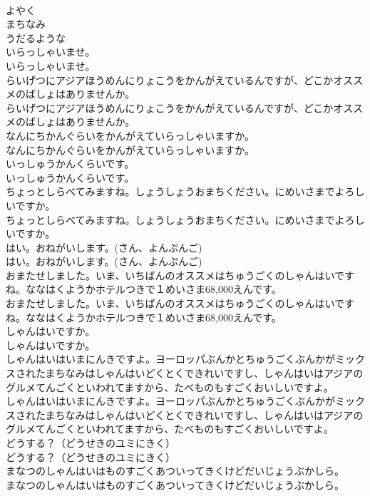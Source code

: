 \documentclass[8pt]{extreport}
\begin{document}
\begin{CJK}{UTF8}{min}
\\	よやく
\\	まちなみ
\\	うだるような
\\	いらっしゃいませ。	
\\	いらっしゃいませ。 
\\	らいげつにアジアほうめんにりょこうをかんがえているんですが、どこかオススメのばしょはありませんか。	
\\	らいげつにアジアほうめんにりょこうをかんがえているんですが、どこかオススメのばしょはありませんか。 
\\	なんにちかんぐらいをかんがえていらっしゃいますか。	
\\	なんにちかんぐらいをかんがえていらっしゃいますか。 
\\	いっしゅうかんくらいです。	
\\	いっしゅうかんくらいです。 
\\	ちょっとしらべてみますね。しょうしょうおまちください。にめいさまでよろしいですか。	
\\	ちょっとしらべてみますね。しょうしょうおまちください。にめいさまでよろしいですか。 
\\	はい。おねがいします。(さん、よんぷんご)	
\\	はい。おねがいします。(さん、よんぷんご) 
\\	おまたせしました。いま、いちばんのオススメはちゅうごくのしゃんはいですね。ななはくようかホテルつきで１めいさま68,000えんです。	
\\	おまたせしました。いま、いちばんのオススメはちゅうごくのしゃんはいですね。ななはくようかホテルつきで１めいさま68,000えんです。 
\\	しゃんはいですか。	
\\	しゃんはいですか。 
\\	しゃんはいはいまにんきですよ。ヨーロッパぶんかとちゅうごくぶんかがミックスされたまちなみはしゃんはいどくとくできれいですし、しゃんはいはアジアのグルメてんごくといわれてますから、たべものもすごくおいしいですよ。	
\\	しゃんはいはいまにんきですよ。ヨーロッパぶんかとちゅうごくぶんかがミックスされたまちなみはしゃんはいどくとくできれいですし、しゃんはいはアジアのグルメてんごくといわれてますから、たべものもすごくおいしいですよ。 
\\	どうする？（どうせきのユミにきく）	
\\	どうする？（どうせきのユミにきく） 
\\	まなつのしゃんはいはものすごくあついってきくけどだいじょうぶかしら。	
\\	まなつのしゃんはいはものすごくあついってきくけどだいじょうぶかしら。 

\end{CJK}
\end{document}

